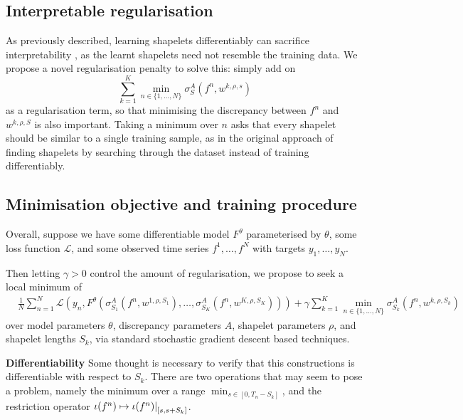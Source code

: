 \documentclass{article}
\theoremstyle{plain}
\theoremstyle{definition}
\newcommand{\restr}[2]{{\left.\kern-\nulldelimiterspace #1 \right|_{#2}}}
\newcommand{\boldheading}[1]{

\textbf{#1}\quad}
\begin{document}
	\subsection{Interpretable regularisation}
	As previously described, learning shapelets differentiably can sacrifice interpretability \cite{wang2019interp}, as the learnt shapelets need not resemble the training data. We propose a novel regularisation penalty to solve this: simply add on
	\begin{equation}
		\label{eq:interpretable_reg}
		\sum_{k = 1}^K \min_{n \in \{1, \ldots, N\}} \sigma^A_S(f^n, w^{k, \rho, s})
	\end{equation}
	as a regularisation term, so that minimising the discrepancy between $f^n$ and $w^{k, \rho, S}$ is also important. %
	Taking a minimum over $n$ asks that every shapelet should be similar to a single training sample, as in the original approach of finding shapelets by searching through the dataset instead of training differentiably.
	
	\subsection{Minimisation objective and training procedure}
	Overall, suppose we have some differentiable model $F^\theta$ parameterised by $\theta$, some loss function $\mathcal{L}$, and some observed time series $f^1, \ldots, f^N$ with targets $y_1, \ldots, y_N$.	
	
	Then letting $\gamma > 0$ control the amount of regularisation, we propose to seek a local minimum of
	\newcommand{\objective}{&\frac{1}{N}\sum_{n = 1}^N \mathcal{L}(y_n, F^\theta(\sigma^A_{S_1}(f^n, w^{1, \rho, S_1}), \ldots, \sigma^A_{S_K}(f^n, w^{K, \rho, S_K}))) + \gamma \sum_{k = 1}^K \min_{n \in \{1, \ldots, N\}} \sigma^A_{S_k}(f^n, w^{k, \rho, S_k})}
	\begin{align}
	\objective \label{eq:objective}
	\end{align}
	over model parameters $\theta$, discrepancy parameters $A$, shapelet parameters $\rho$, and shapelet lengths $S_k$, via standard stochastic gradient descent based techniques.

	\boldheading{Differentiability}
	Some thought is necessary to verify that this constructions is differentiable with respect to $S_k$. %
	There are two operations that may seem to pose a problem, namely the minimum over a range $\min_{s \in [0, T_n - S_k]}$, and the restriction operator $\iota(f^n) \mapsto \restr{\iota(f^n)}{[s, s + S_k]}$.
\end{document}
